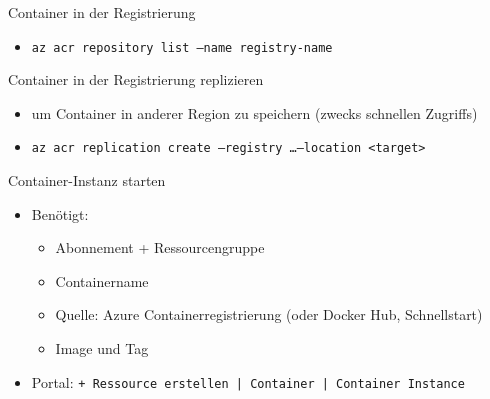 \begin{flashcard}[Definition]{Container in der Registrierung}
    \begin{itemize}
        \item \texttt{az acr repository list --name registry-name}
    \end{itemize}
\end{flashcard}

\begin{flashcard}[Definition]{Container in der Registrierung replizieren}
    \begin{itemize}
        \item um Container in anderer Region zu speichern (zwecks schnellen Zugriffs)
        \item \texttt{az acr replication create --registry \ldots --location <target>}
    \end{itemize}
\end{flashcard}


\begin{flashcard}[Definition]{Container-Instanz starten}
    \begin{itemize}
        \item Benötigt:
            \begin{itemize}
                \item Abonnement + Ressourcengruppe
                \item Containername
                \item Quelle: Azure Containerregistrierung (oder Docker Hub, Schnellstart)
                \item Image und Tag
            \end{itemize}
        \item Portal: \texttt{+ Ressource erstellen | Container | Container Instance}
    \end{itemize}
\end{flashcard}

